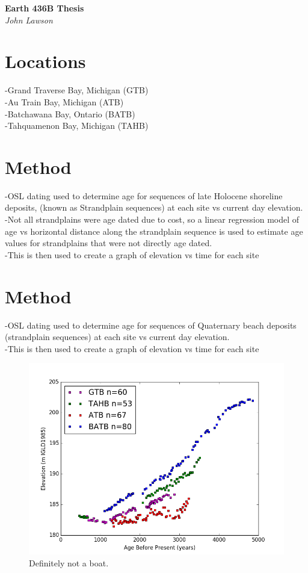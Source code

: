 \documentclass{article}
\begin{document}
\newpage
   \begin{center}
      \Large\textbf{Earth 436B Thesis}\\
      \large\textit{John Lawson}
   \end{center}

\newpage
\section{Locations}   
-Grand Traverse Bay, Michigan (GTB)\\
-Au Train Bay, Michigan (ATB)\\
-Batchawana Bay, Ontario (BATB)\\
-Tahquamenon Bay, Michigan (TAHB)\\
\newpage
\section{Method}
-OSL dating used to determine age for sequences of late Holocene shoreline
deposits, (known as Strandplain sequences) at each site vs current day elevation.\\
-Not all strandplains were age dated due to cost, so a linear regression model of age vs horizontal distance along the strandplain sequence is used to estimate age values for strandplains that were not directly age dated.\\
-This is then used to create a graph of elevation vs time for each site\\
\newpage
\section[2]{Method}
-OSL dating used to determine age for sequences of Quaternary beach deposits (strandplain sequences) at each site vs current day elevation.\\
-This is then used to create a graph of elevation vs time for each site\\
\begin{figure}[h]
	\includegraphics[width=\linewidth]{data/theDataRaw.png}
	\caption{Definitely not a boat.}
	\label{fig:rawData}
\end{figure}
\newpage
\end{document}
